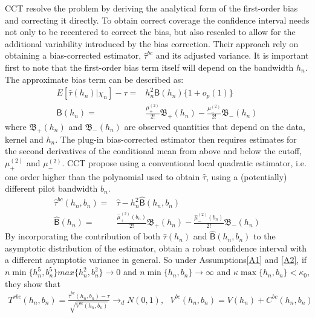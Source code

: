 \documentclass[12pt,fleqn]{article}
\begin{document}
CCT resolve the problem by deriving the analytical form of the 
first-order bias and correcting it directly. To obtain correct coverage the 
confidence interval needs not only to be recentered to correct the bias, but 
also rescaled to allow for the additional variability introduced by the bias 
correction. Their approach rely on obtaining a bias-corrected  estimator, 
$\hat{\tau}^{bc}$ and its adjusted variance. It is important first to note that 
the first-order bias term itself will depend on the bandwidth $h_{n}$. The 
approximate bias term can be described as:
\begin{align*}
     E[\hat{\tau}(h_{n})|\chi_{n}]-\tau=& h_{n}^{2}\mathsf{B}(h_{n})\{1+o_{p}(1)\}\\
     \mathsf{B}(h_{n})=&\frac{\mu_{+}^{(2)}}{2!}\mathfrak{B}_{+}(h_{n})-\frac{\mu_{-}^{(2)}}{2!}\mathfrak{B}_{-}(h_{n})
   \end{align*}
where $\mathfrak{B}_{+}(h_{n})$ and $\mathfrak{B}_{-}(h_{n})$ are observed 
quantities that depend on the data, kernel and $h_{n}$. The plug-in 
bias-corrected estimator then requires estimates for the second derivatives of 
the conditional mean from above and below the cutoff, $\mu_{+}^{(2)}$ and 
$\mu_{-}^{(2)}$. CCT propose using a conventional local quadratic
estimator, i.e. one order higher than the polynomial used to obtain $\hat{\tau}$,
using a (potentially) different pilot bandwidth $b_{n}$.
\begin{align*}
     \hat{\tau}^{bc}(h_{n}, b_{n})=& \hat{\tau}-h_{n}^{2}\hat{\mathsf{B}}(h_{n},b_{n})\\
     \hat{\mathsf{B}}(h_{n})=&\frac{\hat{\mu}_{+}^{(2)}(b_{n})}{2!}
     \mathfrak{B}_{+}(h_{n})-\frac{\hat{\mu}_{-}^{(2)}(b_{n})}{2!}\mathfrak{B}_{-}(h_{n})
   \end{align*}
By incorporating the contribution of both $\hat{\tau}(h_{n})$ and 
$\hat{\mathsf{B}}(h_{n},b_{n})$ to the asymptotic distribution of the estimator,
\cite{calonico2014} obtain a robust confidence interval with a different 
asymptotic variance in general. So under Assumptions\ref{A1} and \ref{A2}, if 
$n\min\{h_{n}^{5}, b_{n}^{5}\}max\{h_{n}^{2}, b_{n}^{2}\}\rightarrow 0$ and 
$n\min\{h_{n}, b_{n}\}\rightarrow \infty$ and $\kappa \max\{h_{n},b_{n}\}< 
\kappa_{0}$, they show that
\begin{align}
  T^{rbc}(h_{n}, b_{n})=\frac{\hat{\tau}^{bc}(h_{n}, b_{n})-\tau}{\sqrt{V^{bc}(h_{n}, b_{n})}}\rightarrow_{d}N(0,1),
  \text{        }V^{bc}(h_{n}, b_{n})=V(h_{n})+C^{bc}(h_{n}, b_{n})\\
 \end{align}
\end{document}
